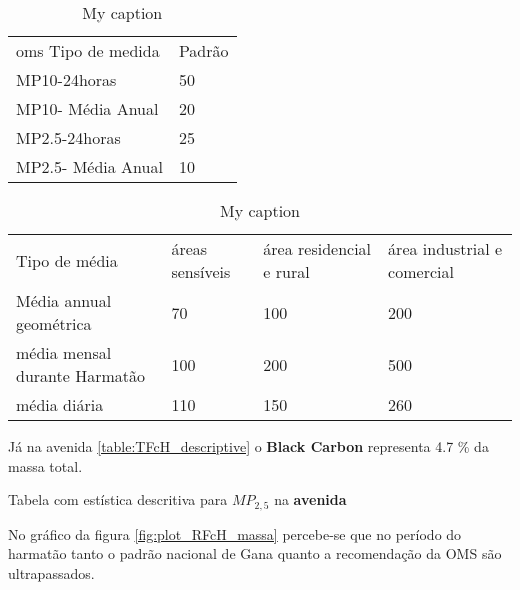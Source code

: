 \begin{table}[]
\centering
\caption{My caption}
\label{my-label}
\begin{tabular}{ll}
oms Tipo de medida & Padrão \\
MP10-24horas       & 50     \\
MP10- Média Anual  & 20     \\
MP2.5-24horas      & 25     \\
MP2.5- Média Anual & 10    
\end{tabular}
\end{table}

\begin{table}[]
\centering
\caption{My caption}
\label{my-label}
\begin{tabular}{llll}
Tipo de média                 & áreas sensíveis & área residencial e rural & área industrial e comercial \\
Média annual geométrica       & 70              & 100                      & 200                         \\
média mensal durante Harmatão & 100             & 200                      & 500                         \\
média diária                  & 110             & 150                      & 260                        
\end{tabular}
\end{table}


Já na avenida \ref{table:TFcH_descriptive} o \textbf{Black Carbon} 
representa 4.7 \% da massa total.

\begin{table}[H]
  \centering
  \begin{scriptsize}
    
  \end{scriptsize}
  \caption{Tabela com estística descritiva para $MP_{2,5}$ na \textbf{avenida}
          \label{table:TFcH_descriptive}}
\end{table}

No gráfico da figura \ref{fig:plot_RFcH_massa} percebe-se que no período 
do harmatão tanto o padrão nacional de Gana quanto a recomendação da OMS 
são ultrapassados.



%    

